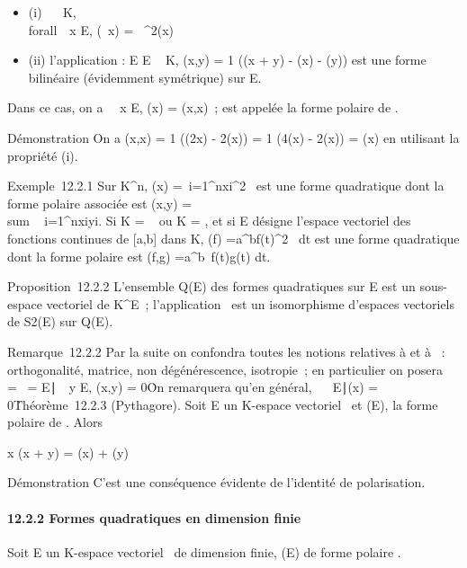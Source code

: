 \begin{itemize}
\itemsep1pt\parskip0pt
\item
  (i) \forall~\lambda~ \in K, \\forall~~x \in
  E, \Phi(\lambda~x) = \lambda~^2\Phi(x)
\item
  (ii) l'application \phi : E \times E \rightarrow~ K, \phi(x,y) = 1  (\Phi(x + y) - \Phi(x) - \Phi(y)) est une forme bilinéaire (évidemment
  symétrique) sur E.
\end{itemize}

Dans ce cas, on a \forall~~x \in E, \Phi(x) = \phi(x,x)~; \phi
est appelée la forme polaire de \Phi.

Démonstration On a \phi(x,x) = 1  (\Phi(2x) - 2\Phi(x))
= 1  (4\Phi(x) - 2\Phi(x)) = \Phi(x) en utilisant la
propriété (i).

Exemple~12.2.1 Sur K^n, \Phi(x) =\
\sum  i=1^nxi^2~
est une forme quadratique dont la forme polaire associée est \phi(x,y)
= \\sum ~
i=1^nxiyi. Si K = ~ ou K = , et si E
désigne l'espace vectoriel des fonctions continues de {[}a,b{]} dans K,
\Phi(f) =\int  a^bf(t)^2~
dt est une forme quadratique dont la forme polaire est \phi(f,g)
=\int  a^b~f(t)g(t) dt.

Proposition~12.2.2 L'ensemble Q(E) des formes quadratiques sur E est un
sous-espace vectoriel de K^E~; l'application
\phi\mapsto~\Phi est un isomorphisme d'espaces vectoriels
de S2(E) sur Q(E).

Remarque~12.2.2 Par la suite on confondra toutes les notions relatives à
\phi et à \Phi~: orthogonalité, matrice, non dégénérescence, isotropie~; en
particulier on posera
\mathrmKer~\Phi
= \mathrmKer~\phi =
\x \in
E∣\forall~~y \in E, \phi(x,y) =
0\. On remarquera qu'en général,
\mathrmKer\Phi\mathrel\neq~~\x
\in E∣\Phi(x) = 0\.

Théorème~12.2.3 (Pythagore). Soit E un K-espace vectoriel ~et \Phi \inQ(E), \phi
la forme polaire de \Phi. Alors

x \bot\phiy \Leftrightarrow \Phi(x + y) = \Phi(x) + \Phi(y)

Démonstration C'est une conséquence évidente de l'identité de
polarisation.

\paragraph{12.2.2 Formes quadratiques en dimension finie}

Soit E un K-espace vectoriel ~de dimension finie, \Phi \inQ(E) de forme
polaire \phi.

